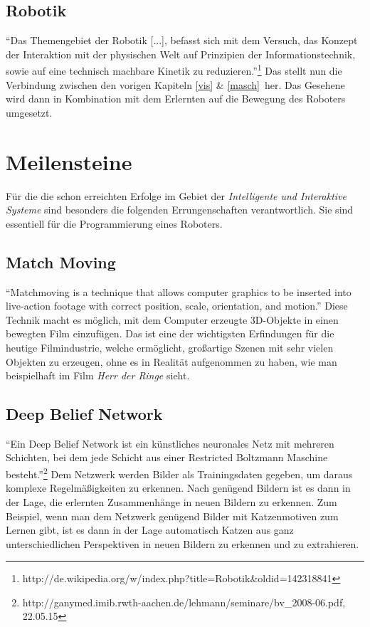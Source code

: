 	\subsection{Robotik}
	\enquote{Das Themengebiet der Robotik [...], befasst sich mit dem Versuch, das Konzept der Interaktion mit der physischen Welt auf Prinzipien der Informationstechnik, sowie auf eine technisch machbare Kinetik zu reduzieren.}\footnote{http://de.wikipedia.org/w/index.php?title=Robotik\&oldid=142318841} Das stellt nun die Verbindung zwischen den vorigen Kapiteln \ref{vis} \& \ref{masch}\ her. Das Gesehene wird dann in Kombination mit dem Erlernten auf die Bewegung des Roboters umgesetzt.
\section{Meilensteine}
Für die die schon erreichten Erfolge im Gebiet der \emph{Intelligente und Interaktive Systeme} sind besonders die folgenden Errungenschaften verantwortlich. Sie sind essentiell für die Programmierung eines Roboters.
	\subsection{Match Moving}
	\enquote{Matchmoving is a technique that allows computer graphics to be inserted into live-action footage with correct position, scale, orientation, and motion.}\cite{dobbert2012matchmoving} Diese Technik macht es möglich, mit dem Computer erzeugte 3D-Objekte in einen bewegten Film einzufügen. Das ist eine der wichtigsten Erfindungen für die heutige Filmindustrie, welche ermöglicht, großartige Szenen mit sehr vielen Objekten zu erzeugen, ohne es in Realität aufgenommen zu haben, wie man beispielhaft im Film \emph{Herr der Ringe} sieht.
	\subsection{Deep Belief Network}
	\enquote{Ein Deep Belief Network ist ein künstliches neuronales Netz mit mehreren Schichten, bei dem jede Schicht aus einer Restricted Boltzmann Maschine besteht.}\footnote{http://ganymed.imib.rwth-aachen.de/lehmann/seminare/bv\_2008-06.pdf, 22.05.15} Dem Netzwerk werden Bilder als Trainingsdaten gegeben, um daraus komplexe Regelmäßigkeiten zu erkennen. Nach genügend Bildern ist es dann in der Lage, die erlernten Zusammenhänge in neuen Bildern zu erkennen. Zum Beispiel, wenn man dem Netzwerk genügend Bilder mit Katzenmotiven zum Lernen gibt, ist es dann in der Lage automatisch Katzen aus ganz unterschiedlichen Perspektiven in neuen Bildern zu erkennen und zu extrahieren.
